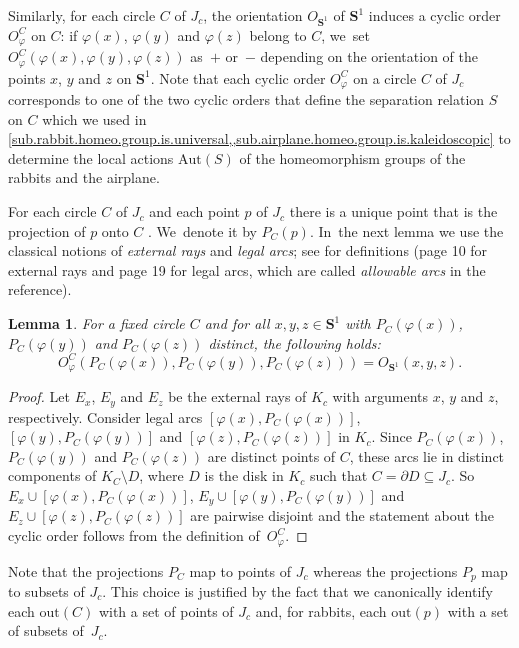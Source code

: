 \documentclass[JEP,XML,SOM,Unicode,NoFloatCountersInSection,published]{cedram}
\theoremstyle{plain}
\newtheorem{lemma}[theorem]{Lemma}
\theoremstyle{definition}
\theoremstyle{remark}
\newcommand{\Aut}{\mathrm{Aut}}
\begin{document}
Similarly, for each circle $C$ of $J_c$, the orientation $O_{\mathbf{S}^1}$ of $\mathbf{S}^1$ induces a cyclic order~$O_\varphi^C$ on $C$:
if $\varphi(x)$, $\varphi(y)$ and $\varphi(z)$ belong to $C$, we~set $O_\varphi^C(\varphi(x),\varphi(y),\varphi(z))$ as~$+$ or~$-$ depending on the orientation of the points $x$, $y$ and $z$ on $\mathbf{S}^1$.
Note that each cyclic order $O_\varphi^C$ on a circle $C$ of $J_c$ corresponds to one of the two cyclic orders that define the separation relation $S$ on $C$ which we used in \cref{sub.rabbit.homeo.group.is.universal,,sub.airplane.homeo.group.is.kaleidoscopic} to determine the local actions $\Aut(S)$ of the homeomorphism groups of the rabbits and the airplane.

For each circle $C$ of $J_c$ and each point $p$ of $J_c$ there is a unique point that is the projection of $p$ onto $C$ \cite[Exp.\,II, Prop.\,4]{douady-hubbard-I}. We~denote it by $P_C(p)$. In~the next lemma we use the classical notions of \textit{external rays} and \textit{legal arcs};
see \cite{Douady-Hubbard-English} for definitions (page 10 for external rays and page 19 for legal arcs, which are called \textit{allowable arcs} in the reference).

\begin{lemma}
\label{lem.circle.projection}
For a fixed circle $C$ and for all $x, y, z \in \mathbf{S}^1$ with $P_C(\varphi(x))$, $P_C(\varphi(y))$ and $P_C(\varphi(z))$ distinct, the following holds:
\[
 O_\varphi^C(P_C(\varphi(x)), P_C(\varphi(y)), P_C(\varphi(z))) = O_{\mathbf{S}^1}(x,y,z). 
\]
\end{lemma}

\begin{proof}
Let $E_x$, $E_y$ and $E_z$ be the external rays of $K_c$ with arguments $x$, $y$ and $z$, respectively.
Consider legal arcs $[\varphi(x),P_C(\varphi(x))]$, $[\varphi(y),P_C(\varphi(y))]$ and $[\varphi(z),P_C(\varphi(z))]$ in $K_c$.
Since $P_C(\varphi(x))$, $P_C(\varphi(y))$ and $P_C(\varphi(z))$ are distinct points of $C$, these arcs lie in distinct components of $K_C\setminus D$, where $D$ is the disk in $K_c$ such that $C=\partial D \subseteq J_c$.
So $E_x\cup[\varphi(x),P_C(\varphi(x))]$, $E_y\cup[\varphi(y),P_C(\varphi(y))]$ and $E_z\cup[\varphi(z),P_C(\varphi(z))]$ are pairwise disjoint and the statement about the cyclic order follows from the definition of~$O_\varphi^C$.
\end{proof}

Note that the projections $P_C$ map to points of $J_c$ whereas the projections $P_p$ map to subsets of $J_c$.
This choice is justified by the fact that we canonically identify each $\mathrm{out}(C)$ with a set of points of $J_c$ and, for rabbits, each $\mathrm{out}(p)$ with a set of subsets of~$J_c$.
\end{document}
